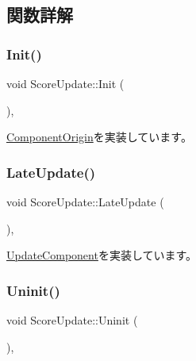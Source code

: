 \subsection{関数詳解}
\mbox{\label{class_score_update_afd51e11ad00ebc15d9b3139398437afc}} 
\subsubsection{\texorpdfstring{Init()}{Init()}}
{\footnotesize\ttfamily void Score\+Update\+::\+Init (\begin{DoxyParamCaption}{ }\end{DoxyParamCaption})\hspace{0.3cm}{\ttfamily [override]}, {\ttfamily [virtual]}}



\mbox{\hyperlink{class_component_origin_a9f674891257f2272b1636d8b6bb05d81}{Component\+Origin}}を実装しています。

\mbox{\label{class_score_update_adc9a48f54828e49c072c298777935893}} 
\subsubsection{\texorpdfstring{Late\+Update()}{LateUpdate()}}
{\footnotesize\ttfamily void Score\+Update\+::\+Late\+Update (\begin{DoxyParamCaption}{ }\end{DoxyParamCaption})\hspace{0.3cm}{\ttfamily [override]}, {\ttfamily [virtual]}}



\mbox{\hyperlink{class_update_component_aecc61593be4d1feff2db4d9ff1f83f9f}{Update\+Component}}を実装しています。

\mbox{\label{class_score_update_a701d9c84c3ef92b1c54f33b37e23605f}} 
\subsubsection{\texorpdfstring{Uninit()}{Uninit()}}
{\footnotesize\ttfamily void Score\+Update\+::\+Uninit (\begin{DoxyParamCaption}{ }\end{DoxyParamCaption})\hspace{0.3cm}{\ttfamily [override]}, {\ttfamily [virtual]}}




